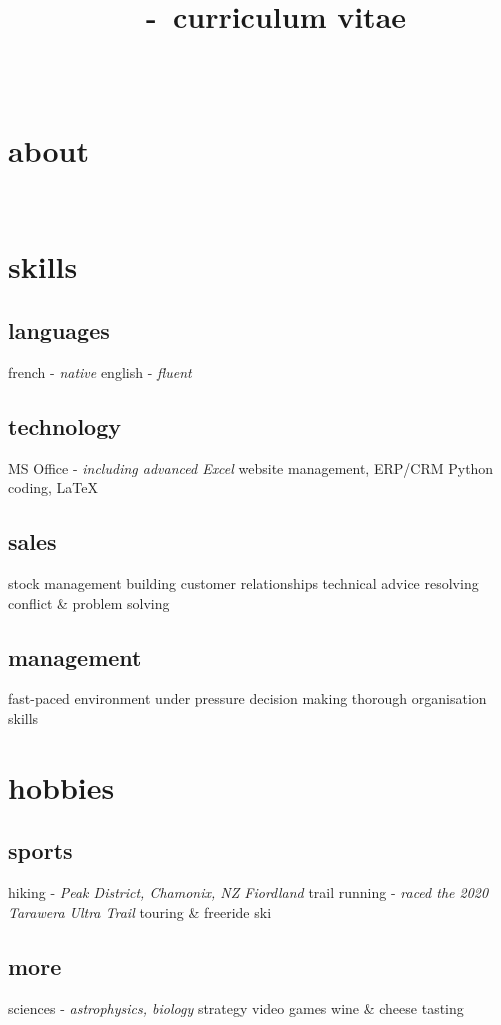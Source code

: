 \documentclass[a4paper]{farangoth-cv}
\newcommand*{\cvTitle}{curriculum vitae}
\begin{document}
\title{\myFirstName\ \myLastName\ \--\ \cvTitle}
\author{\myFirstName\ \myLastName}

\makeheader{}


\begin{aside}
  \section{about}\label{sec:about}
  \href{mailto:\myMail}{\myMail}
  \href{tel:\myPhoneNumberUK}{\myPhoneNumberUK}
  ~
  \myAddress{}

  \section{skills}
  \subsection{languages}
  french \-- \emph{native}
  english \-- \emph{fluent}

  \subsection{technology}
  MS Office \--  \emph{including advanced Excel}
  website management, ERP/CRM
  Python coding, \LaTeX%

  \subsection{sales}
  stock management
  building customer relationships
  technical advice
  resolving conflict \& problem solving

  \subsection{management}
  fast-paced environment
  under pressure decision making
  thorough organisation skills

  \section{hobbies}
  \subsection{sports}
  hiking \-- \emph{Peak District, Chamonix, NZ Fiordland}
  trail running \-- \emph{raced the 2020 Tarawera Ultra Trail}
  touring \& freeride ski
  \subsection{more}
  sciences \-- \emph{astrophysics, biology}
  strategy video games
  wine \& cheese tasting
\end{aside}
\end{document}
